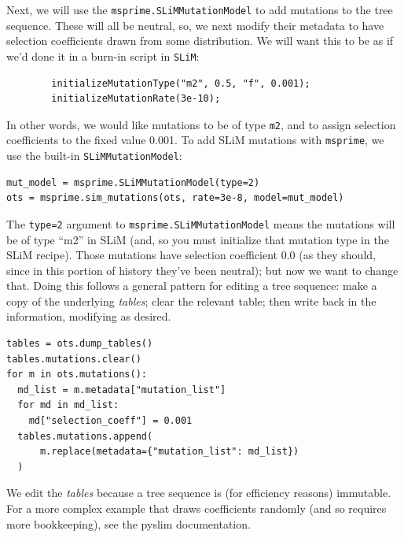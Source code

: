 \documentclass[12pt]{article}
\newcommand{\msprime}[0]{\texttt{msprime}\xspace}
\newcommand{\slim}[0]{\texttt{SLiM}\xspace}
\begin{document}
Next, we will use the \verb|msprime.SLiMMutationModel| to add mutations to the tree sequence.
These will all be neutral,
so, we next modify their metadata to have selection coefficients drawn from some distribution.
We will want this to be as if we'd done it in a burn-in script in \slim:
\begin{verbatim}
        initializeMutationType("m2", 0.5, "f", 0.001);
        initializeMutationRate(3e-10);
\end{verbatim}
In other words, we would like mutations to be of type \verb|m2|,
and to assign selection coefficients to the fixed value 0.001.
To add SLiM mutations with \msprime, we use the built-in
\verb|SLiMMutationModel|:
\begin{verbatim}
mut_model = msprime.SLiMMutationModel(type=2)
ots = msprime.sim_mutations(ots, rate=3e-8, model=mut_model)
\end{verbatim}

The \verb|type=2| argument to \verb|msprime.SLiMMutationModel|
means the mutations will be of type ``m2'' in SLiM
(and, so you must initialize that mutation type in the SLiM recipe).
Those mutations have selection coefficient 0.0
(as they should, since in this portion of history they've been neutral);
but now we want to change that.
Doing this follows a general pattern for editing a tree sequence:
make a copy of the underlying \emph{tables};
clear the relevant table;
then write back in the information, modifying as desired.

\begin{verbatim}
tables = ots.dump_tables()
tables.mutations.clear()
for m in ots.mutations():
  md_list = m.metadata["mutation_list"]
  for md in md_list:
    md["selection_coeff"] = 0.001
  tables.mutations.append(
      m.replace(metadata={"mutation_list": md_list})
  )
\end{verbatim}

We edit the \emph{tables} because a tree sequence is (for efficiency reasons) immutable.
For a more complex example that draws coefficients randomly (and so requires more bookkeeping),
see the pyslim documentation.
\end{document}
